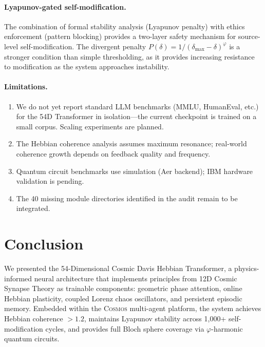 \documentclass[11pt,a4paper]{article}
\begin{document}
\paragraph{Lyapunov-gated self-modification.}
The combination of formal stability analysis (Lyapunov penalty) with ethics enforcement (pattern blocking) provides a two-layer safety mechanism for source-level self-modification. The divergent penalty $P(\delta) = 1/(\delta_{\max} - \delta)^\varphi$ is a stronger condition than simple thresholding, as it provides increasing resistance to modification as the system approaches instability.

\paragraph{Limitations.}
\begin{enumerate}[leftmargin=*,itemsep=2pt]
    \item We do not yet report standard LLM benchmarks (MMLU, HumanEval, etc.) for the 54D Transformer in isolation---the current checkpoint is trained on a small corpus. Scaling experiments are planned.
    \item The Hebbian coherence analysis assumes maximum resonance; real-world coherence growth depends on feedback quality and frequency.
    \item Quantum circuit benchmarks use simulation (Aer backend); IBM hardware validation is pending.
    \item The 40 missing module directories identified in the audit remain to be integrated.
\end{enumerate}

\section{Conclusion}
\label{sec:conclusion}

We presented the 54-Dimensional Cosmic Davis Hebbian Transformer, a physics-informed neural architecture that implements principles from 12D Cosmic Synapse Theory as trainable components: geometric phase attention, online Hebbian plasticity, coupled Lorenz chaos oscillators, and persistent episodic memory. Embedded within the \textsc{Cosmos} multi-agent platform, the system achieves Hebbian coherence $>1.2$, maintains Lyapunov stability across 1{,}000+ self-modification cycles, and provides full Bloch sphere coverage via $\varphi$-harmonic quantum circuits.
\end{document}
